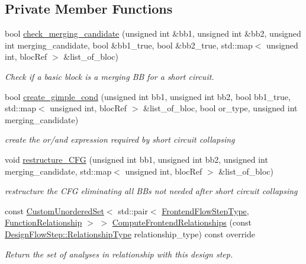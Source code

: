 \subsection*{Private Member Functions}
\begin{DoxyCompactItemize}
\item 
bool \hyperlink{classshort__circuit__taf_a5d3b7d29cc59c1bd90bdb77872d90c77}{check\+\_\+merging\+\_\+candidate} (unsigned int \&bb1, unsigned int \&bb2, unsigned int merging\+\_\+candidate, bool \&bb1\+\_\+true, bool \&bb2\+\_\+true, std\+::map$<$ unsigned int, bloc\+Ref $>$ \&list\+\_\+of\+\_\+bloc)
\begin{DoxyCompactList}\small\item\em Check if a basic block is a merging BB for a short circuit. \end{DoxyCompactList}\item 
bool \hyperlink{classshort__circuit__taf_ae72320e3a6c9112a5d7fe80414294d46}{create\+\_\+gimple\+\_\+cond} (unsigned int bb1, unsigned int bb2, bool bb1\+\_\+true, std\+::map$<$ unsigned int, bloc\+Ref $>$ \&list\+\_\+of\+\_\+bloc, bool or\+\_\+type, unsigned int merging\+\_\+candidate)
\begin{DoxyCompactList}\small\item\em create the or/and expression required by short circuit collapsing \end{DoxyCompactList}\item 
void \hyperlink{classshort__circuit__taf_a9f88813508d66f82309a90b24788f3f1}{restructure\+\_\+\+C\+FG} (unsigned int bb1, unsigned int bb2, unsigned int merging\+\_\+candidate, std\+::map$<$ unsigned int, bloc\+Ref $>$ \&list\+\_\+of\+\_\+bloc)
\begin{DoxyCompactList}\small\item\em restructure the C\+FG eliminating all B\+Bs not needed after short circuit collapsing \end{DoxyCompactList}\item 
const \hyperlink{classCustomUnorderedSet}{Custom\+Unordered\+Set}$<$ std\+::pair$<$ \hyperlink{frontend__flow__step_8hpp_afeb3716c693d2b2e4ed3e6d04c3b63bb}{Frontend\+Flow\+Step\+Type}, \hyperlink{classFrontendFlowStep_af7cf30f2023e5b99e637dc2058289ab0}{Function\+Relationship} $>$ $>$ \hyperlink{classshort__circuit__taf_aa20b443f2eb7bdefea17819fc62b2ce0}{Compute\+Frontend\+Relationships} (const \hyperlink{classDesignFlowStep_a723a3baf19ff2ceb77bc13e099d0b1b7}{Design\+Flow\+Step\+::\+Relationship\+Type} relationship\+\_\+type) const override
\begin{DoxyCompactList}\small\item\em Return the set of analyses in relationship with this design step. \end{DoxyCompactList}\item 

\end{DoxyCompactItemize}
